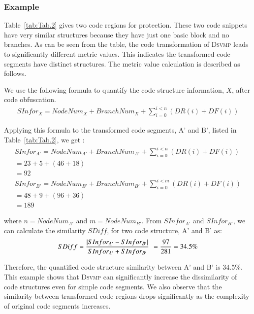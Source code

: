 \documentclass[preprint,12pt,3p]{elsarticle}
\newcommand{\DSVMP}{\textsc{Dsvmp}\xspace}
\begin{document}
\subsubsection{Example}
Table~\ref{tab:Tab.2} gives two code regions for protection. These  two code snippets have very similar structures because they have just one basic block and no branches. 
As can be seen from the table, the code transformation of \DSVMP leads to significantly different metric values. This indicates the transformed code segments have distinct structures.
The metric value calculation is described as follows. 

We use the following formula to quantify the code structure information, $X$, after code obfuscation.
\[\begin{array}{l}
 SInfo{r_{X}} = NodeNu{m_{X}} + BranchNu{m_{X}} + \sum\limits_{i = 0}^{i < n} {(DR(i) + DF(i))}
 \end{array}\]

Applying this formula to the transformed code segments, A' and  B', listed in Table~\ref{tab:Tab.2},  we get :
\[\begin{array}{l}
 SInfo{r_{A'}} = NodeNu{m_{A'}} + BranchNu{m_{A'}} + \sum\limits_{i = 0}^{i < n} {(DR(i) + DF(i))} \\
                                        = 23 + 5 + (46 + 18)\\
                                        = 92 \\
 SInfo{r_{B'}} = NodeNu{m_{B'}} + BranchNu{m_{B'}} + \sum\limits_{i = 0}^{i < m} {(DR(i) + DF(i))}  \\
                                        = 48 + 9 + (96 + 36)\\
                                        =  189
\end{array}\]

where $n=NodeNu{m_{A'}}$ and $m=NodeNu{m_{B'}}$.
From $SInfo{r_{A'}}$ and $SInfo{r_{B'}}$,
we can calculate the similarity $SDiff$, for two code structure, A' and B' as:
\begin{align*}
SDiff = \frac{{|SInfo{r_{A'}} - SInfo{r_{B'}}|}}{{SInfo{r_{A'}} + SInfo{r_{B'}}}}\;{\kern 1pt}  = \frac{{97}}{{281}} = 34.5\% \end{align*}

Therefore, the quantified code structure similarity between A' and B' is  34.5\%.
This example shows that \DSVMP can significantly increase the dissimilarity of code structures even for simple code segments.
We also observe that the similarity between transformed code regions drops significantly
as the complexity of original code segments increases.
\end{document}
